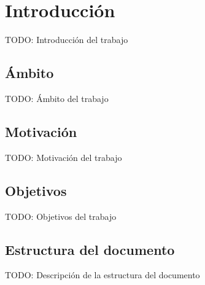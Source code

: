 \chapter{Introducción}

TODO: Introducción del trabajo


\section{\'Ambito}

TODO: Ámbito del trabajo


\section{Motivación}

TODO: Motivación del trabajo


\section{Objetivos}

TODO: Objetivos del trabajo


\section{Estructura del documento}

TODO: Descripción de la estructura del documento
